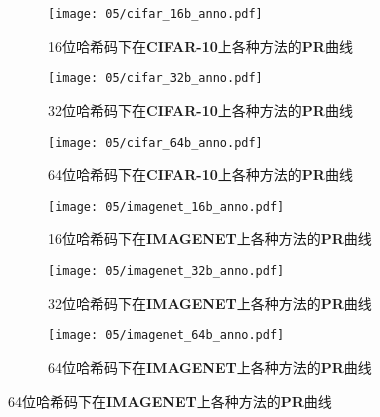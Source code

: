 \begin{figure}[!htp]
  \centering
  \begin{subfigure}{0.45\textwidth}
    \centering
    \texttt{[image: 05/cifar\_16b\_anno.pdf]}
    \caption{16位哈希码下在\textbf{CIFAR-10}上各种方法的\textbf{PR}曲线}
  \end{subfigure}
  \hspace{1cm}
  \begin{subfigure}{0.45\textwidth}
    \centering
    \texttt{[image: 05/cifar\_32b\_anno.pdf]}
    \caption{32位哈希码下在\textbf{CIFAR-10}上各种方法的\textbf{PR}曲线}
  \end{subfigure}
  \hspace{1cm}
  \begin{subfigure}{0.45\textwidth}
    \centering
    \texttt{[image: 05/cifar\_64b\_anno.pdf]}
    \caption{64位哈希码下在\textbf{CIFAR-10}上各种方法的\textbf{PR}曲线}
  \end{subfigure}
  \hspace{1cm}
  \begin{subfigure}{0.45\textwidth}
    \centering
    \texttt{[image: 05/imagenet\_16b\_anno.pdf]}
    \caption{16位哈希码下在\textbf{IMAGENET}上各种方法的\textbf{PR}曲线}
  \end{subfigure}
  \hspace{1cm}
  \begin{subfigure}{0.45\textwidth}
    \centering
    \texttt{[image: 05/imagenet\_32b\_anno.pdf]}
    \caption{32位哈希码下在\textbf{IMAGENET}上各种方法的\textbf{PR}曲线}
  \end{subfigure}
  \hspace{1cm}
  \begin{subfigure}{0.45\textwidth}
    \centering
    \texttt{[image: 05/imagenet\_64b\_anno.pdf]}
    \caption{64位哈希码下在\textbf{IMAGENET}上各种方法的\textbf{PR}曲线}
  \end{subfigure}
  \label{fig:abloss3}
\end{figure}

